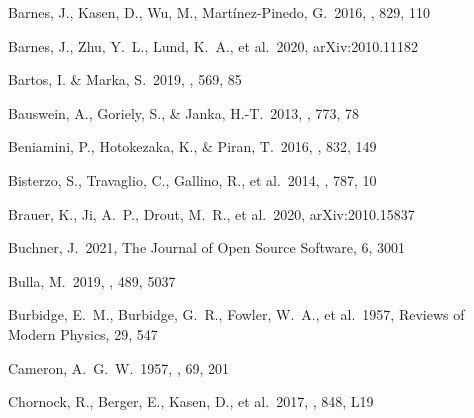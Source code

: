 \documentclass[twocolumn, twocolappendix]{aastex63}
\begin{document}
\begin{thebibliography}{}




 Barnes, J., Kasen, D., Wu, M., Mart\'{i}nez-Pinedo, G.\ 2016, \apj, 829, 110


 Barnes, J., Zhu, Y.~L., Lund, K.~A., et al.\ 2020, arXiv:2010.11182




 Bartos, I. \& Marka, S.\ 2019, \nat, 569, 85


 Bauswein, A., Goriely, S., \& Janka, H.-T.\ 2013, \apj, 773, 78



 Beniamini, P., Hotokezaka, K., \& Piran, T.\ 2016, \apj, 832, 149



 Bisterzo, S., Travaglio, C., Gallino, R., et al.\ 2014, \apj, 787, 10


 Brauer, K., Ji, A.~P., Drout, M.~R., et al.\ 2020, arXiv:2010.15837


 Buchner, J.\ 2021, The Journal of Open Source Software, 6, 3001


 Bulla, M.\ 2019, \mnras, 489, 5037


 Burbidge, E.~M., Burbidge, G.~R., Fowler, W.~A., et al.\ 1957, Reviews of Modern Physics, 29, 547


 Cameron, A.~G.~W.\ 1957, \pasp, 69, 201




 Chornock, R., Berger, E., Kasen, D., et al.\ 2017, \apjl, 848, L19



\end{thebibliography}
\end{document}
